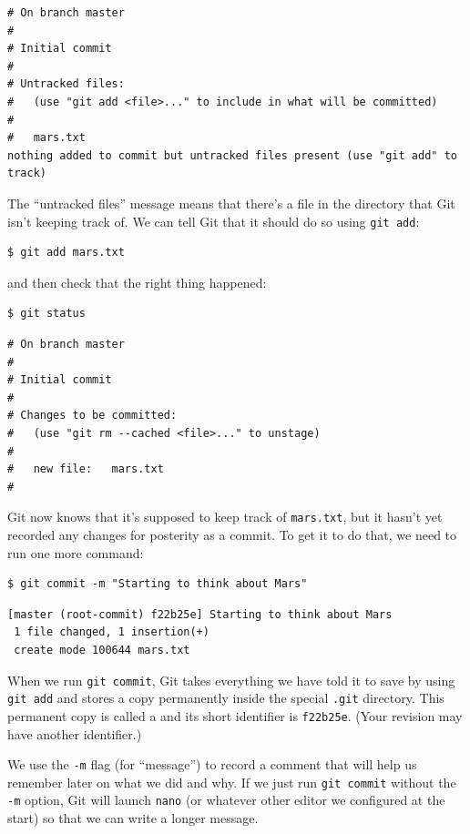 \documentclass{book}
\begin{document}
\begin{verbatim}
# On branch master
#
# Initial commit
#
# Untracked files:
#   (use "git add <file>..." to include in what will be committed)
#
#   mars.txt
nothing added to commit but untracked files present (use "git add" to track)
\end{verbatim}

The ``untracked files'' message means that there's a file in the
directory that Git isn't keeping track of. We can tell Git that it
should do so using \texttt{git add}:

\begin{verbatim}
$ git add mars.txt
\end{verbatim}

and then check that the right thing happened:

\begin{verbatim}
$ git status
\end{verbatim}

\begin{verbatim}
# On branch master
#
# Initial commit
#
# Changes to be committed:
#   (use "git rm --cached <file>..." to unstage)
#
#   new file:   mars.txt
#
\end{verbatim}

Git now knows that it's supposed to keep track of \texttt{mars.txt}, but
it hasn't yet recorded any changes for posterity as a commit. To get it
to do that, we need to run one more command:

\begin{verbatim}
$ git commit -m "Starting to think about Mars"
\end{verbatim}

\begin{verbatim}
[master (root-commit) f22b25e] Starting to think about Mars
 1 file changed, 1 insertion(+)
 create mode 100644 mars.txt
\end{verbatim}

When we run \texttt{git commit}, Git takes everything we have told it to
save by using \texttt{git add} and stores a copy permanently inside the
special \texttt{.git} directory. This permanent copy is called a
 and its short identifier is
\texttt{f22b25e}. (Your revision may have another identifier.)

We use the \texttt{-m} flag (for ``message'') to record a comment that
will help us remember later on what we did and why. If we just run
\texttt{git commit} without the \texttt{-m} option, Git will launch
\texttt{nano} (or whatever other editor we configured at the start) so
that we can write a longer message.
\end{document}
